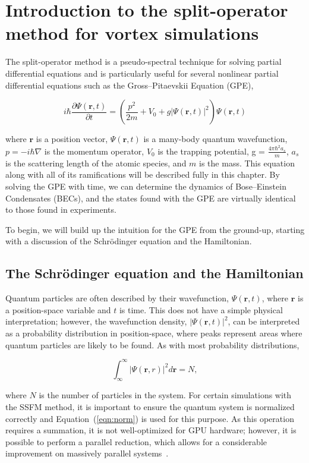 \chapter{Introduction to the split-operator method for vortex simulations}
\label{ch:splitop}

The split-operator method is a pseudo-spectral technique for solving partial differential equations and is particularly useful for several nonlinear partial differential equations such as the Gross--Pitaevskii Equation (GPE),

$$
i \hbar \frac{\partial \Psi(\mathbf{r},t)}{\partial t} = \left(\frac{p^2}{2m} + V_0 + g |\Psi(\mathbf{r},t)|^2 \right)\Psi(\mathbf{r},t)
$$

\noindent where $\mathbf{r}$ is a position vector, $\Psi(\mathbf{r},t)$ is a many-body quantum wavefunction, $p = -i\hbar\nabla$ is the momentum operator, $V_0$ is the trapping potential, g = $\frac{4\pi\hbar^2 a_s}{m}$, $a_s$ is the scattering length of the atomic species, and $m$ is the mass.
This equation along with all of its ramifications will be described fully in this chapter.
By solving the GPE with time, we can determine the dynamics of Bose--Einstein Condensates (BECs), and
the states found with the GPE are virtually identical to those found in experiments.

To begin, we will build up the intuition for the GPE from the ground-up, starting with a discussion of the Schr\"odinger equation and the Hamiltonian.

\section{The Schr\"odinger equation and the Hamiltonian}
Quantum particles are often described by their wavefunction, $\Psi(\mathbf{r},t)$, where $\mathbf{r}$ is a position-space variable and $t$ is time.
This does not have a simple physical interpretation; however, the wavefunction density, $|\Psi(\mathbf{r},t)|^2$, can be interpreted as a probability distribution in position-space, where peaks represent areas where quantum particles are likely to be found.
As with most probability distributions,

\begin{equation}
    \label{eqn:norm}
    \int_\infty^\infty |\Psi(\mathbf{r},r)|^2 d\mathbf{r} = N,
\end{equation}

\noindent where $N$ is the number of particles in the system.
For certain simulations with the SSFM method, it is important to ensure the quantum system is normalized correctly and Equation~(\ref{eqn:norm}) is used for this purpose.
As this operation requires a summation, it is not well-optimized for GPU hardware; however, it is possible to perform a parallel reduction, which allows for a considerable improvement on massively parallel systems~\cite{harris2007}.

